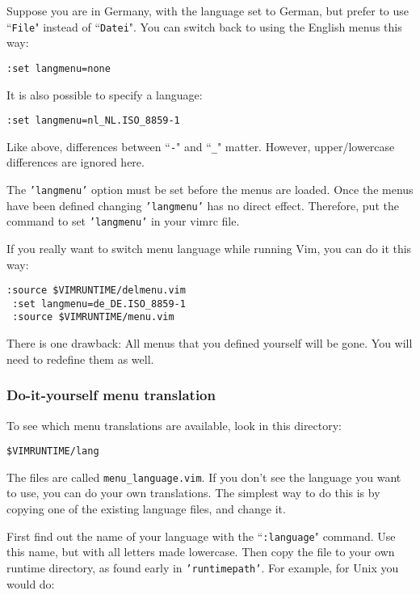 Suppose you are in Germany, with the language set to German, but prefer to use ``\texttt{File}" instead of ``\texttt{Datei}".
You can switch back to using the English menus this way:

\begin{Verbatim}[samepage=true]
 :set langmenu=none
\end{Verbatim}

It is also possible to specify a language:

\begin{Verbatim}[samepage=true]
 :set langmenu=nl_NL.ISO_8859-1
\end{Verbatim}

Like above, differences between ``\texttt{-}" and ``\texttt{\_}" matter.
However, upper/lowercase differences are ignored here.

The \texttt{'langmenu'} option must be set before the menus are loaded.
Once the menus have been defined changing \texttt{'langmenu'} has no direct effect.
Therefore, put the command to set \texttt{'langmenu'} in your vimrc file.

If you really want to switch menu language while running Vim, you can do it this way:

\begin{Verbatim}[samepage=true]
 :source $VIMRUNTIME/delmenu.vim
 :set langmenu=de_DE.ISO_8859-1
 :source $VIMRUNTIME/menu.vim
\end{Verbatim}

There is one drawback: All menus that you defined yourself will be gone.
You will need to redefine them as well.

\subsubsection{Do-it-yourself menu translation}
To see which menu translations are available, look in this directory:

\begin{Verbatim}[samepage=true]
    $VIMRUNTIME/lang
\end{Verbatim}

The files are called \texttt{menu\_{language}.vim}.
If you don't see the language you want to use, you can do your own translations.
The simplest way to do this is by copying one of the existing language files, and change it.

First find out the name of your language with the ``\texttt{:language}" command.
Use this name, but with all letters made lowercase.
Then copy the file to your own runtime directory, as found early in \texttt{'runtimepath'}.
For example, for Unix you would do:

